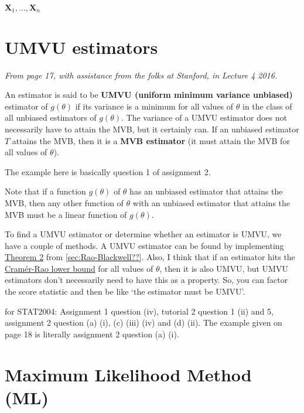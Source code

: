 \(\bm{X}_1,\ldots,\bm{X}_n\)

\section{UMVU estimators}\label{sec:UMVU ests}

\textit{From page 17, with assistance from the folks at Stanford, \autocite{stanford} in Lecture 4 2016.}

An estimator is said to be \textbf{UMVU (uniform minimum variance unbiased)} estimator of \(g(\theta)\) if its variance is a minimum for all values of \(\theta\) in the class of all unbiased estimators of \(g(\theta)\). 
The variance of a UMVU estimator does not necessarily have to attain the MVB, but it certainly can.
If an unbiased estimator \(T\) attains the MVB, then it is a \textbf{MVB estimator} (it must attain the MVB for all values of \(\theta\)). 

\begin{example}
    The example here is basically question 1 of assignment 2.
\end{example}

Note that if a function \(g(\theta)\) of \(\theta\) has an unbiased estimator that attains the MVB, then any other function of \(\theta\) with an unbiased estimator that attains the MVB must be a linear function of \(g(\theta)\). 

\bigskip

To find a UMVU estimator or determine whether an estimator is UMVU, we have a couple of methods. 
A UMVU estimator can be found by implementing \hyperref[thm:thm 2 UMVU]{Theorem 2} from \cref{sec:Rao-Blackwell??}. 
Also, I think that if an estimator hits the  \hyperref[defn:cramer]{Cram\'{e}r-Rao lower bound} for all values of \(\theta\), then it is also UMVU, but UMVU estimators don't necessarily need to have this as a property. 
So, you can factor the score statistic and then be like `the estimator must be UMVU'. 

\begin{exercise}
    for STAT2004: Assignment 1 question (iv), tutorial 2 question 1 (ii) and 5, assignment 2 question (a) (i), (c) (iii) (iv) and (d) (ii). 
    The example given on page 18 is literally assignment 2 question (a) (i). 
\end{exercise}

\section{Maximum Likelihood Method (ML)}\label{sec:ML method}

